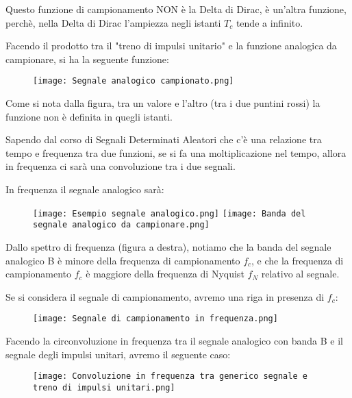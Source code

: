 Questo funzione di campionamento NON è la Delta di Dirac, è un'altra funzione, perchè, nella Delta di Dirac l'ampiezza negli istanti $T_c$ tende a infinito. \newline 

Facendo il prodotto tra il "treno di impulsi unitario" e la funzione analogica da campionare, 
si ha la seguente funzione: 

\begin{figure}[h]
    \centering
    \texttt{[image: Segnale analogico campionato.png]}
\end{figure} 

Come si nota dalla figura, tra un valore e l'altro (tra i due puntini rossi) la funzione non è definita in quegli istanti. \newline 

Sapendo dal corso di Segnali Determinati Aleatori che c'è una relazione tra tempo e frequenza tra due funzioni, 
se si fa una moltiplicazione nel tempo, allora in frequenza ci sarà una convoluzione tra i due segnali. \newline 

In frequenza il segnale analogico sarà:

\begin{figure}[h]
    \centering
    \texttt{[image: Esempio segnale analogico.png]}
    \texttt{[image: Banda del segnale analogico da campionare.png]}
\end{figure}

\newpage 

Dallo spettro di frequenza (figura a destra), 
notiamo che la banda del segnale analogico B è minore della frequenza di campionamento $f_c$, 
e che la frequenza di campionamento $f_c$ è maggiore della frequenza di Nyquist $f_N$ relativo al segnale. \newline 

Se si considera il segnale di campionamento, avremo una riga in presenza di $f_c$: 

\begin{figure}[h]
    \centering
    \texttt{[image: Segnale di campionamento in frequenza.png]}
\end{figure} 

Facendo la circonvoluzione in frequenza tra il segnale analogico con banda B e il segnale degli impulsi unitari, 
avremo il seguente caso: 

\begin{figure}[h]
    \centering
    \texttt{[image: Convoluzione in frequenza tra generico segnale e treno di impulsi unitari.png]}
\end{figure} 

